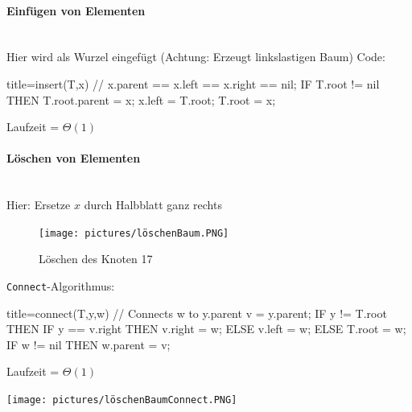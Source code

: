 \documentclass[
    ngerman,
    color=3b,
    load_common, %
    summary,
    boxarc,
]{tuda_summary}
\begin{document}
\paragraph{Einfügen von Elementen}\mbox{}\\
Hier wird als Wurzel eingefügt (Achtung: Erzeugt linkslastigen Baum)
Code:

\begin{codeBlock}[autogobble]{title={insert(T,x) // x.parent == x.left == x.right == nil;}}
    IF T.root != nil THEN
      T.root.parent = x;
      x.left = T.root;
    T.root = x;
\end{codeBlock}
Laufzeit = $\Theta(1)$

\paragraph{Löschen von Elementen}\mbox{}\\
Hier: Ersetze $x$ durch Halbblatt ganz rechts
\begin{figure}[h]
    \centering
    \texttt{[image: pictures/löschenBaum.PNG]}
    \caption{Löschen des Knoten 17}
\end{figure}
\clearpage
\texttt{Connect}-Algorithmus:\\
\begin{minipage}[c]{0.6\textwidth-1.853pt}
    \begin{codeBlock}[autogobble]{title={connect(T,y,w) // Connects w to y.parent}}
        v = y.parent;
        IF y != T.root THEN
            IF y == v.right THEN
                v.right = w;
            ELSE
                v.left = w;
        ELSE
            T.root = w;
        IF w != nil THEN
            w.parent = v;
    \end{codeBlock}
    Laufzeit = $\Theta(1)$
\end{minipage}
\begin{minipage}[c]{0.4\textwidth}
    \centering
    \texttt{[image: pictures/löschenBaumConnect.PNG]}
\end{minipage}
\end{document}
